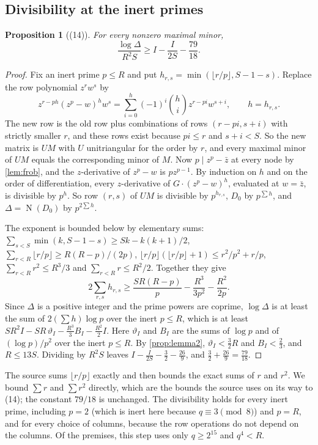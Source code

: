 \documentclass[11pt]{article}
\newtheorem{proposition}[theorem]{Proposition}
\theoremstyle{definition}
\newcommand{\Nm}{\operatorname{N}}
\begin{document}
\subsection{Divisibility at the inert primes}\label{sec:divisibility}

\begin{proposition}[(14)]\label{prop:div}
For every nonzero maximal minor,
\[
\frac{\log\Delta}{R^2S} \ge I - \frac{I}{2S} - \frac{79}{18}.
\]
\end{proposition}

\begin{proof}
Fix an inert prime $p \le R$ and put $h_{r,s} = \min(\lfloor r/p\rfloor, S - 1 - s)$. Replace the row polynomial $z^rw^s$ by
\[
z^{r - ph}(z^p - w)^h w^s = \sum_{i=0}^{h}(-1)^i\binom hi z^{r - pi}w^{s+i}, \qquad h = h_{r,s}.
\]
The new row is the old row plus combinations of rows $(r - pi, s + i)$ with strictly smaller $r$, and these rows exist because $pi \le r$ and $s + i < S$. So the new matrix is $UM$ with $U$ unitriangular for the order by $r$, and every maximal minor of $UM$ equals the corresponding minor of $M$. Now $p \mid z^p - \bar z$ at every node by \cref{lem:frob}, and the $z$-derivative of $z^p - w$ is $pz^{p-1}$. By induction on $h$ and on the order of differentiation, every $z$-derivative of $G\cdot(z^p - w)^h$, evaluated at $w = \bar z$, is divisible by $p^h$. So row $(r,s)$ of $UM$ is divisible by $p^{h_{r,s}}$, $D_0$ by $p^{\sum h}$, and $\Delta = \Nm(D_0)$ by $p^{2\sum h}$.

The exponent is bounded below by elementary sums: $\sum_{s<S}\min(k, S-1-s) \ge Sk - k(k+1)/2$, $\sum_{r<R}\lfloor r/p\rfloor \ge R(R-p)/(2p)$, $\lfloor r/p\rfloor(\lfloor r/p\rfloor + 1) \le r^2/p^2 + r/p$, $\sum_{r<R} r^2 \le R^3/3$ and $\sum_{r<R} r \le R^2/2$. Together they give
\[
2\sum_{r,s}h_{r,s} \ge \frac{SR(R-p)}{p} - \frac{R^3}{3p^2} - \frac{R^2}{2p}.
\]
Since $\Delta$ is a positive integer and the prime powers are coprime, $\log\Delta$ is at least the sum of $2(\sum h)\log p$ over the inert $p \le R$, which is at least $SR^2I - SR\,\vartheta_I - \frac{R^3}{3}B_I - \frac{R^2}{2}I$. Here $\vartheta_I$ and $B_I$ are the sums of $\log p$ and of $(\log p)/p^2$ over the inert $p \le R$. By \cref{prop:lemma2}, $\vartheta_I < \frac32 R$ and $B_I < \frac23$, and $R \le 13S$. Dividing by $R^2S$ leaves $I - \frac{I}{2S} - \frac32 - \frac{26}{9}$, and $\frac32 + \frac{26}9 = \frac{79}{18}$.
\end{proof}

The source sums $\lfloor r/p\rfloor$ exactly and then bounds the exact sums of $r$ and $r^2$. We bound $\sum r$ and $\sum r^2$ directly, which are the bounds the source uses on its way to (14); the constant $79/18$ is unchanged. The divisibility holds for every inert prime, including $p = 2$ (which is inert here because $q \equiv 3 \pmod 8$) and $p = R$, and for every choice of columns, because the row operations do not depend on the columns. Of the premises, this step uses only $q \ge 2^{15}$ and $q^4 < R$.
\end{document}
